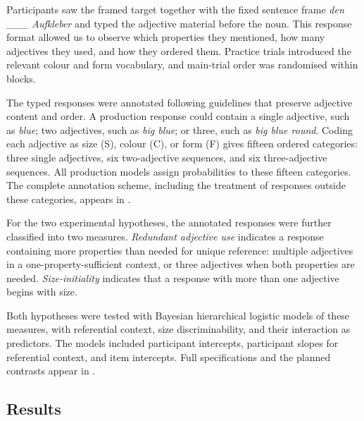 \documentclass[10pt,a4paper,fleqn]{article}
\newcommand{\adj}[1]{\textsc{#1}}
\begin{document}
Participants saw the framed target together with the fixed sentence frame \emph{den \_\_\_ Aufkleber} and typed the adjective material before the noun.
This response format allowed us to observe which properties they mentioned, how many adjectives they used, and how they ordered them.
Practice trials introduced the relevant colour and form vocabulary, and main-trial order was randomised within blocks.

The typed responses were annotated following guidelines that preserve adjective content and order.
A production response could contain a single adjective, such as \emph{blue}; two adjectives, such as \emph{big blue}; or three, such as \emph{big blue round}.
Coding each adjective as size (\adj{S}), colour (\adj{C}), or form (\adj{F}) gives fifteen ordered categories: three single adjectives, six two-adjective sequences, and six three-adjective sequences.
All production models assign probabilities to these fifteen categories.
The complete annotation scheme, including the treatment of responses outside these categories, appears in .

For the two experimental hypotheses, the annotated responses were further classified into two measures.
\emph{Redundant adjective use} indicates a response containing more properties than needed for unique reference: multiple adjectives in a one-property-sufficient context, or three adjectives when both properties are needed.
\emph{Size-initiality} indicates that a response with more than one adjective begins with size.

Both hypotheses were tested with Bayesian hierarchical logistic models of these measures, with referential context, size discriminability, and their interaction as predictors.
The models included participant intercepts, participant slopes for referential context, and item intercepts.
Full specifications and the planned contrasts appear in .

\subsection{Results}
\label{sec:production-results}
\end{document}
